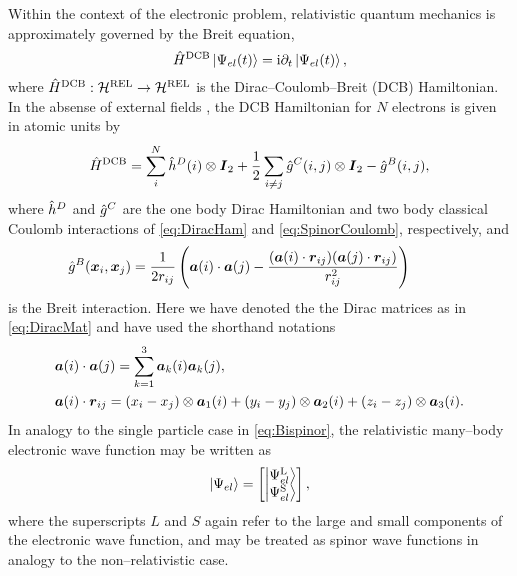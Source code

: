 Within the context of the electronic problem, relativistic quantum mechanics is approximately governed
by the Breit equation,
\begin{equation}
\label{eq:BreitEq}
\hat{H}^{\mathrm{DCB}} \left\vert \Psi_{el} (t) \right\rangle = \mathrm i \partial_t \left\vert \Psi_{el} (t) \right\rangle,
\end{equation}
where $\hat{H}^{\mathrm{DCB}} : \mathcal{H}^{\mathrm{REL}} \rightarrow \mathcal{H}^{\mathrm{REL}}$ is the Dirac--Coulomb--Breit (DCB) Hamiltonian.
In the absense of external fields , the DCB Hamiltonian for $N$ electrons is given in atomic units by 
\begin{equation}
  \label{eq:DCBHam}
  \hat{H}^{\mathrm{DCB}} = \sum_i^N  \hat{h}^D(i) \otimes \boldsymbol{I}_2 + \frac{1}{2} \sum_{i \neq j}\hat{g}^C(i,j) \otimes \boldsymbol{I}_2 
  - \hat{g}^B(i,j),
\end{equation}
where $\hat{h}^D$ and $\hat{g}^C$ are the one body Dirac Hamiltonian and two body classical Coulomb interactions of \cref{eq:DiracHam} and 
\cref{eq:SpinorCoulomb}, respectively, and
\begin{align}
  &\hat{g}^B(\boldsymbol{x}_i,\boldsymbol{x}_j) = \frac{1}{2r_{ij}} \left( \boldsymbol{a}(i)\cdot\boldsymbol{a}(j) - \frac{(\boldsymbol{a}(i) \cdot \boldsymbol{r}_{ij}) (\boldsymbol{a}(j) \cdot \boldsymbol{r}_{ij})}{r_{ij}^2}\right) 
\qquad  \label{eq:BreitInt}
\end{align}
is the Breit interaction. Here we have denoted the the Dirac matrices as in \cref{eq:DiracMat}
and have used the shorthand notations
\begin{align}
  &\boldsymbol{a}(i) \cdot \boldsymbol{a}(j) = \sum_{k = 1}^3 \boldsymbol{a}_k(i) \boldsymbol{a}_k(j), \\
  &\boldsymbol{a}(i) \cdot \boldsymbol{r}_{ij} = (x_i - x_j) \otimes \boldsymbol{a}_1(i) + (y_i - y_j) \otimes \boldsymbol{a}_2(i) + (z_i - z_j) \otimes \boldsymbol{a}_3(i).
\end{align}
In analogy to the single particle case in \cref{eq:Bispinor}, the relativistic many--body electronic wave function may be written as
\begin{equation}
  \label{eq:MolBispinor}
  \left\vert \Psi_{el} \right\rangle = 
    \begin{bmatrix}
       \left\vert \Psi_{el}^\mathrm{L} \right\rangle \\
       \left\vert \Psi_{el}^\mathrm{S} \right\rangle 
    \end{bmatrix},
\end{equation}
where the superscripts $L$ and $S$ again refer to the large and small components of the electronic wave function,
and may be treated as spinor wave functions in analogy to the non--relativistic case.




